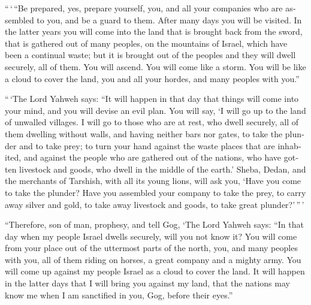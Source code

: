 \begin{paracol}{2}
\begin{otherlanguage}{english}
 ``\,`\,``Be prepared, yes, prepare yourself, you, and all
your companies who are assembled to you, and be a guard to them.
 After many days you will be visited. In the latter years
you will come into the land that is brought back from the sword, that is
gathered out of many peoples, on the mountains of Israel, which have
been a continual waste; but it is brought out of the peoples and they
will dwell securely, all of them.  You will ascend. You
will come like a storm. You will be like a cloud to cover the land, you
and all your hordes, and many peoples with you.''

 ``\,`The Lord Yahweh says: ``It will happen in that day
that things will come into your mind, and you will devise an evil plan.
 You will say, `I will go up to the land of unwalled
villages. I will go to those who are at rest, who dwell securely, all of
them dwelling without walls, and having neither bars nor gates,
 to take the plunder and to take prey; to turn your hand
against the waste places that are inhabited, and against the people who
are gathered out of the nations, who have gotten livestock and goods,
who dwell in the middle of the earth.'  Sheba, Dedan, and
the merchants of Tarshish, with all its young lions, will ask you, `Have
you come to take the plunder? Have you assembled your company to take
the prey, to carry away silver and gold, to take away livestock and
goods, to take great plunder?'\,''\,'

 ``Therefore, son of man, prophesy, and tell Gog, `The
Lord Yahweh says: ``In that day when my people Israel dwells securely,
will you not know it?  You will come from your place out
of the uttermost parts of the north, you, and many peoples with you, all
of them riding on horses, a great company and a mighty army.
 You will come up against my people Israel as a cloud to
cover the land. It will happen in the latter days that I will bring you
against my land, that the nations may know me when I am sanctified in
you, Gog, before their eyes.''


\end{otherlanguage}
\end{paracol}
